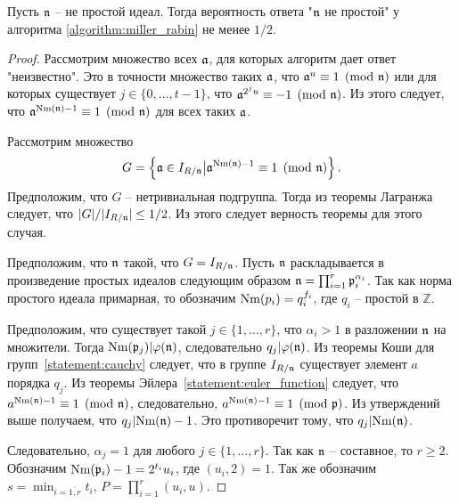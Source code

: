 \documentclass[_00_dissertation.tex]{subfiles}
\begin{document}
\begin{proposition}
    Пусть $\mathfrak{n}$ -- не простой идеал.
    Тогда вероятность ответа "$\mathfrak{n}$ не простой" у алгоритма \ref{algorithm:miller_rabin} не менее $1/2$.
\end{proposition}
\begin{proof}
    Рассмотрим множество всех $\mathfrak{a}$, для которых алгоритм дает ответ "неизвестно".
    Это в точности множество таких $\mathfrak{a}$, что $\mathfrak{a}^u \equiv 1 \pmod{\mathfrak{n}}$ или для которых существует $j \in \{0, \dots, t-1\}$, что $\mathfrak{a}^{2^{j}u} \equiv -1 \pmod{\mathfrak{n}}$.
    Из этого следует, что $\mathfrak{a}^{\textrm{Nm}(\mathfrak{n}) - 1} \equiv 1 \pmod{\mathfrak{n}}$ для всех таких $\mathfrak{a}$.

    Рассмотрим множество
    \begin{equation*}
        G = \left\{
            \mathfrak{a} \in I_{R/\mathfrak{n}} \big| \mathfrak{a}^{\textrm{Nm}(\mathfrak{n}) - 1} \equiv 1 \pmod{\mathfrak{n}}
        \right\}.
    \end{equation*}
    Предположим, что $G$ -- нетривиальная подгруппа.
    Тогда из теоремы Лагранжа следует, что $|G| / |I_{R/\mathfrak{n}}| \le 1/2$.
    Из этого следует верность теоремы для этого случая.

    Предположим, что $\mathfrak{n}$ такой, что $G = I_{R/\mathfrak{n}}$.
    Пусть $\mathfrak{n}$ раскладывается в произведение простых идеалов следующим образом $\mathfrak{n} = \prod_{i=1}^r \mathfrak{p}_i^{\alpha_i}$.
    Так как норма простого идеала примарная, то обозначим $\textrm{Nm}(p_i) = q_i^{f_i}$, где $q_i$ -- простой в $\mathbb{Z}$.

    Предположим, что существует такой $j \in \{1, \dots, r\}$, что $\alpha_i > 1$ в разложении $\mathfrak{n}$ на множители.
    Тогда $\textrm{Nm}(\mathfrak{p}_j) | \varphi(\mathfrak{n})$, следовательно $q_j | \varphi(\mathfrak{n})$.
    Из теоремы Коши для групп~\ref{statement:cauchy} следует, что в группе $I_{R/\mathfrak{n}}$ существует элемент $a$ порядка $q_j$.
    Из теоремы Эйлера~\ref{statement:euler_function} следует, что $a^{\textrm{Nm}(\mathfrak{n}) - 1} \equiv 1 \pmod{\mathfrak{n}}$, следовательно, $a^{\textrm{Nm}(\mathfrak{n}) - 1} \equiv 1 \pmod{\mathfrak{p}}$.
    Из утверждений выше получаем, что $q_j | \textrm{Nm}(\mathfrak{n}) - 1$.
    Это противоречит тому, что $q_j | \textrm{Nm}(\mathfrak{n})$.

    Следовательно, $\alpha_j = 1$ для любого $j \in \{1, \dots, r\}$.
    Так как $\mathfrak{n}$ -- составное, то $r \ge 2$.
    Обозначим $\textrm{Nm}(\mathfrak{p}_i) - 1 = 2^{t_i} u_i$, где $(u_i, 2) = 1$.
    Так же обозначим $s = \min_{i=\overline{1, r}} t_i$, $P = \prod_{i=1}^r (u_i, u)$.


\end{proof}
\end{document}
